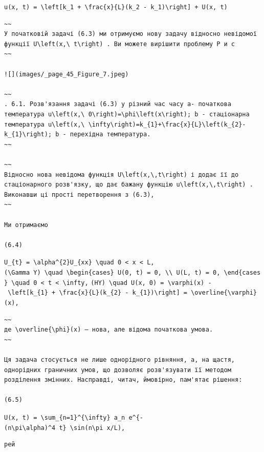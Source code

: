 \documentclass[
  ukrainian,
]{article}
\begin{document}
\texttt{u(x,\ t)\ =\ \textbackslash{}left{[}k\_1\ +\ \textbackslash{}frac\{x\}\{L\}(k\_2\ -\ k\_1)\textbackslash{}right{]}\ +\ U(x,\ t)}

\begin{verbatim}
~~
У початковій задачі (6.3) ми отримуємо нову задачу відносно невідомої функції U\left(x,\ t\right) . Ви можете вирішити проблему Р и с
~~

![](images/_page_45_Figure_7.jpeg)

~~
. 6.1. Розв'язання задачі (6.3) у різний час часу a- початкова температура u\left(x,\ 0\right)=\phi\left(x\right); b - стаціонарна температура u\left(x,\ \infty\right)=k_{1}+\frac{x}{L}\left(k_{2}-k_{1}\right); b - перехідна температура.
~~

~~
Відносно нова невідома функція U\left(x,\,t\right) і додає її до стаціонарного розв'язку, що дає бажану функцію u\left(x,\,t\right) . Виконавши ці прості перетворення з (6.3),
~~

Ми отримаємо

(6.4)
\end{verbatim}

\texttt{U\_\{t\}\ =\ \textbackslash{}alpha\^{}\{2\}U\_\{xx\}\ \textbackslash{}quad\ 0\ \textless{}\ x\ \textless{}\ L,}
\texttt{(\textbackslash{}Gamma\ Y)\ \textbackslash{}quad\ \textbackslash{}begin\{cases\}\ U(0,\ t)\ =\ 0,\ \textbackslash{}\textbackslash{}\ U(L,\ t)\ =\ 0,\ \textbackslash{}end\{cases\}\ \textbackslash{}quad\ 0\ \textless{}\ t\ \textless{}\ \textbackslash{}infty,}
\texttt{(HY)\ \textbackslash{}quad\ U(x,\ 0)\ =\ \textbackslash{}varphi(x)\ -\ \textbackslash{}left{[}k\_\{1\}\ +\ \textbackslash{}frac\{x\}\{L\}(k\_\{2\}\ -\ k\_\{1\})\textbackslash{}right{]}\ =\ \textbackslash{}overline\{\textbackslash{}varphi\}(x),}

\begin{verbatim}
~~
де \overline{\phi}(x) — нова, але відома початкова умова.
~~

Ця задача стосується не лише однорідного рівняння, а, на щастя, однорідних граничних умов, що дозволяє розв'язувати її методом розділення змінних. Насправді, читач, ймовірно, пам'ятає рішення:

(6.5)
\end{verbatim}

\texttt{U(x,\ t)\ =\ \textbackslash{}sum\_\{n=1\}\^{}\{\textbackslash{}infty\}\ a\_n\ e\^{}\{-(n\textbackslash{}pi\textbackslash{}alpha)\^{}4\ t\}\ \textbackslash{}sin(n\textbackslash{}pi\ x/L),}

\begin{verbatim}
рей
\end{verbatim}
\end{document}

